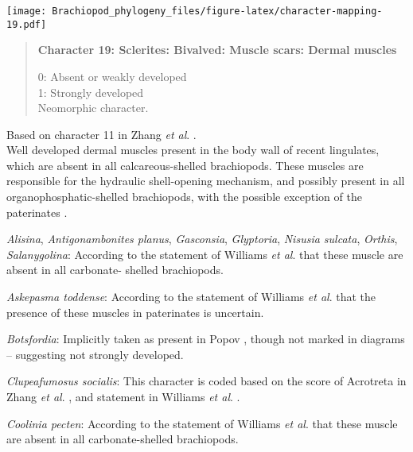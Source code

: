 \documentclass[openany]{book}
\theoremstyle{definition}
\theoremstyle{definition}
\theoremstyle{definition}
\theoremstyle{remark}
\begin{document}
\texttt{[image: Brachiopod\_phylogeny\_files/figure-latex/character-mapping-19.pdf]}

\begin{quote}
\textbf{Character 19: Sclerites: Bivalved: Muscle scars: Dermal muscles}

0: Absent or weakly developed\\
1: Strongly developed\\
Neomorphic character.
\end{quote}

Based on character 11 in Zhang \emph{et al}.
\citeyearpar{Zhang2014Anearly}.\\
Well developed dermal muscles present in the body wall of recent
lingulates, which are absent in all calcareous-shelled brachiopods.
These muscles are responsible for the hydraulic shell-opening mechanism,
and possibly present in all organophosphatic-shelled brachiopods, with
the possible exception of the paterinates
\citep[p.~32]{Williams2000LinguliformeaCraniiformea}.

\hypertarget{Alisina-coding-19}{}
\emph{Alisina}, \emph{Antigonambonites planus}, \emph{Gasconsia},
\emph{Glyptoria}, \emph{Nisusia sulcata}, \emph{Orthis},
\emph{Salanygolina}: According to the statement of Williams \emph{et
al}. \citeyearpar[p.~32]{Williams2000LinguliformeaCraniiformea} that
these muscle are absent in all carbonate- shelled brachiopods.

\hypertarget{Askepasma_toddense-coding-19}{}
\emph{Askepasma toddense}: According to the statement of Williams
\emph{et al}. \citeyearpar[p.~32]{Williams2000LinguliformeaCraniiformea}
that the presence of these muscles in paterinates is uncertain.

\hypertarget{Botsfordia-coding-19}{}
\emph{Botsfordia}: Implicitly taken as present in Popov
\citeyearpar{Popov1992TheCambrian}, though not marked in diagrams --
suggesting not strongly developed.

\hypertarget{Clupeafumosus_socialis-coding-19}{}
\emph{Clupeafumosus socialis}: This character is coded based on the
score of Acrotreta in Zhang \emph{et al}.
\citeyearpar{Zhang2014Anearly}, and statement in Williams \emph{et al}.
\citeyearpar[P.32]{Williams2000LinguliformeaCraniiformea}.

\hypertarget{Coolinia_pecten-coding-19}{}
\emph{Coolinia pecten}: According to the statement of Williams \emph{et
al}. \citeyearpar[p.~32]{Williams2000LinguliformeaCraniiformea} that
these muscle are absent in all carbonate-shelled brachiopods.
\end{document}
